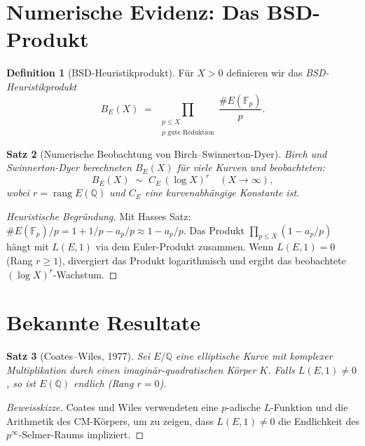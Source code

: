 \documentclass[12pt,a4paper]{amsart}
\newtheorem{theorem}{Satz}[section]
\theoremstyle{definition}
\newtheorem{definition}[theorem]{Definition}
\newcommand{\Q}{\mathbb{Q}}
\newcommand{\Fp}{\mathbb{F}_p}
\DeclareMathOperator{\rang}{rang}
\begin{document}
\section{Numerische Evidenz: Das BSD-Produkt}

\begin{definition}[BSD-Heuristikprodukt]
\label{def:bsd_product}
F\"ur $X > 0$ definieren wir das \emph{BSD-Heuristikprodukt}
\[
  B_E(X) \;=\; \prod_{\substack{p \le X\\ p\text{ gute Reduktion}}}
  \frac{\#E(\Fp)}{p}.
\]
\end{definition}

\begin{theorem}[Numerische Beobachtung von Birch--Swinnerton-Dyer]
\label{thm:bsd_numerical}
Birch und Swinnerton-Dyer \cite{BSD1965} berechneten $B_E(X)$ f\"ur viele
Kurven und beobachteten:
\[
  B_E(X) \;\sim\; C_E\,(\log X)^r \quad (X \to \infty),
\]
wobei $r = \rang E(\Q)$ und $C_E$ eine kurvenabh\"angige Konstante ist.
\end{theorem}

\begin{proof}[Heuristische Begr\"undung]
Mit Hasses Satz: $\#E(\Fp)/p = 1 + 1/p - a_p/p \approx 1 - a_p/p$.
Das Produkt $\prod_{p \le X}(1-a_p/p)$ h\"angt mit $L(E,1)$ via dem
Euler-Produkt zusammen.
Wenn $L(E,1) = 0$ (Rang $r \ge 1$), divergiert das Produkt logarithmisch
und ergibt das beobachtete $(\log X)^r$-Wachstum.
\end{proof}

\section{Bekannte Resultate}

\begin{theorem}[Coates--Wiles, 1977]
\label{thm:coates_wiles}
Sei $E/\Q$ eine elliptische Kurve mit komplexer Multiplikation durch
einen imagin\"ar-quadratischen K\"orper $K$.
Falls $L(E,1) \ne 0$, so ist $E(\Q)$ endlich (Rang $r = 0$).
\end{theorem}

\begin{proof}[Beweisskizze]
Coates und Wiles \cite{CoatesWiles1977} verwendeten eine $p$-adische
$L$-Funktion und die Arithmetik des CM-K\"orpers, um zu zeigen, dass
$L(E,1) \ne 0$ die Endlichkeit des $p^\infty$-Selmer-Raums impliziert.
\end{proof}
\end{document}

